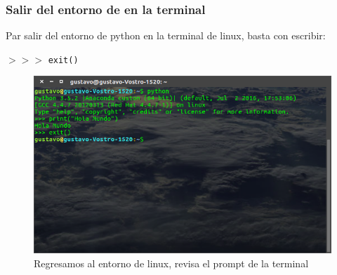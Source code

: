\begin{frame}
\frametitle{Salir del entorno de \python en la terminal}
Par salir del entorno de python en la terminal de linux, basta con escribir:
\begin{center}
$>>>$ \texttt{exit()} \keys{\return}
\end{center}
\pause
\begin{figure}
	\centering
	\includegraphics[scale=0.25]{Terminal_04}
	\caption{Regresamos al entorno de linux, revisa el prompt de la terminal}
\end{figure}
\end{frame}
